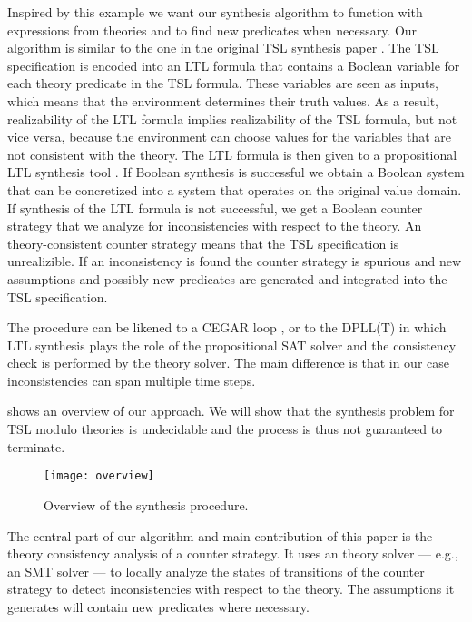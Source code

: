 \documentclass[runningheads]{llncs}
\begin{document}
Inspired by this example we want our synthesis algorithm to function with expressions from theories and to find new predicates when necessary. Our algorithm is similar to the one in the original TSL synthesis paper \cite{finkbeiner2019a}.
The TSL specification is encoded into an LTL formula that contains a Boolean variable for each theory predicate in the TSL formula. These variables are seen as inputs, which means that the environment determines their truth values. As a result, realizability of the LTL formula implies realizability of the TSL formula, but not vice versa, because the environment can choose values for the variables that are not consistent with the theory. 
The LTL formula is then given to a propositional LTL synthesis tool \cite{meyer2018,schewe2007}. If Boolean synthesis is successful we obtain a Boolean system that can be concretized into a system that operates on the original value domain.
If synthesis of the LTL formula is not successful, we get a Boolean counter strategy that we analyze for inconsistencies with respect to the theory.
An theory-consistent counter strategy means that the TSL specification is unrealizible.
If an inconsistency is found the counter strategy is spurious and new assumptions and possibly new predicates are generated and integrated into the TSL specification.

The procedure can be likened to a CEGAR loop \cite{clarke2000},  or to the DPLL(T) in which LTL synthesis plays the role of the propositional SAT solver and the consistency check is performed by the theory solver. The main difference is that in our case inconsistencies can span multiple time steps.


 shows an overview of our approach.
We will show that the synthesis problem for TSL modulo theories is undecidable and the process is thus not guaranteed to terminate.

\begin{figure}
    \centering
    \texttt{[image: overview]}
    \caption{Overview of the synthesis procedure.}
    \label{fig:overview}
\end{figure}

The central part of our algorithm and main contribution of this paper is the theory consistency analysis of a counter strategy.
It uses an theory solver --- e.g., an SMT solver --- to locally analyze the states of transitions of the counter strategy to detect inconsistencies with respect to the theory. The assumptions it generates will contain new predicates where necessary. 
\end{document}
